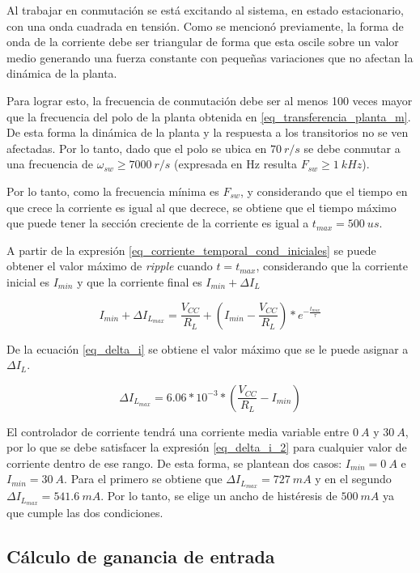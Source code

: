 Al trabajar en conmutación se está excitando al sistema, en estado estacionario, con una onda cuadrada en tensión. Como se mencionó previamente, la forma de onda de la corriente debe ser triangular de forma que esta oscile sobre un valor medio generando una fuerza constante con pequeñas variaciones que no afectan la dinámica de la planta.

Para lograr esto, la frecuencia de conmutación debe ser al menos 100 veces mayor que la frecuencia del polo de la planta obtenida en \ref{eq_transferencia_planta_m}.
De esta forma la dinámica de la planta y la respuesta a los transitorios no se ven afectadas.  Por lo tanto, dado que el polo se ubica en $70\:r/s$  se debe conmutar a una frecuencia de $\omega_{sw}\geq7000\:r/s$ (expresada en Hz resulta $F_{sw}\geq1\:kHz$).

Por lo tanto, como la frecuencia mínima es $F_{sw}$, y considerando que el tiempo en que crece la corriente es igual al que decrece, se obtiene que el tiempo máximo que puede tener la sección creciente de la corriente es igual a $t_{max}=500\:us$. 

A partir de la expresión \ref{eq_corriente_temporal_cond_iniciales} se puede obtener el valor máximo de \textsl{ripple} cuando $t=t_{max}$, considerando que la corriente inicial es $I_{min}$ y que la corriente final es $I_{min}+\Delta I_L$

\begin{equation} \label{eq_delta_i}
	I_{min}+\Delta I_{L_{max}}=\frac{V_{CC}}{R_L}+(I_{min}-\frac{V_{CC}}{R_L})*e^{-\frac{t_{max}}{\tau}}
\end{equation}

De la ecuación \ref{eq_delta_i} se obtiene el valor máximo que se le puede asignar a $\Delta I_L$. 

\begin{equation} \label{eq_delta_i_2}
	\Delta I_{L_{max}}=6.06*10^{-3}*(\frac{V_{CC}}{R_L}-I_{min})
\end{equation}

El controlador de corriente tendrá una corriente media variable entre $0\:A$ y $30\:A$, por lo que se debe satisfacer la expresión \ref{eq_delta_i_2} para cualquier valor de corriente dentro de ese rango. De esta forma, se plantean dos casos: $I_{min}=0\:A$ e $I_{min}=30\:A$. Para el primero se obtiene que $\Delta I_{L_{max}}=727\:mA$ y en el segundo $\Delta I_{L_{max}}=541.6\:mA$. Por lo tanto, se elige un ancho de histéresis de $500\:mA$ ya que cumple las dos condiciones.

\subsection{Cálculo de ganancia de entrada}

